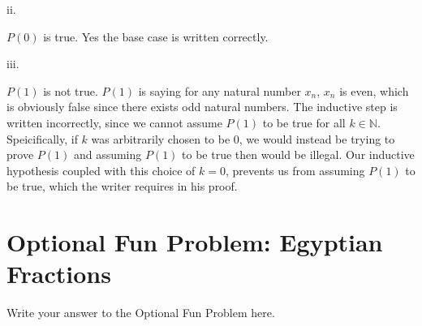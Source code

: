 \documentclass{article}
\renewcommand{\(}{\left(}
\renewcommand{\)}{\right)}
\theoremstyle{plain}
\theoremstyle{plain}
\theoremstyle{definition}
\begin{document}
    ii.
    \begin{shaded}
        $P(0)$ is true. Yes the base case is written correctly. 
    \end{shaded}
    
    iii.
    \begin{shaded}
        $P(1)$ is not true. $P(1)$ is saying for any natural number $x_{n}$, $x_{n}$ is even, which is obviously false since there exists odd natural numbers. The inductive step is written incorrectly, since we cannot assume $P(1)$ to be true for all $k\in\mathbb{N}$. Speicifically, if $k$ was arbitrarily chosen to be 0, we would instead be trying to prove $P(1)$ and assuming $P(1)$ to be true then would be illegal. Our inductive hypothesis coupled with this choice of $k=0$, prevents us from assuming $P(1)$ to be true, which the writer requires in his proof.
    \end{shaded}

\newpage

\section*{Optional Fun Problem: Egyptian Fractions}
\begin{shaded}
Write your answer to the Optional Fun Problem here.
\end{shaded}

    
\end{document}
